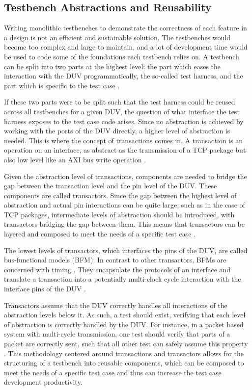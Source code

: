 \subsection{Testbench Abstractions and Reusability} %

Writing monolithic testbenches to demonstrate the correctness of each feature
in a design is not an efficient and sustainable solution. The testbenches would become too complex and large to
maintain, and a lot of development time would be
used to code some of the foundations each testbench relies on. A testbench can be split into two parts at the highest
level: the part which eases the interaction with the DUV programmatically, the so-called test harness, and the part
which is specific to the test case \cite[Ch. 6]{bergeron2012writing}.

If these two parts were to be split such that the test harness could be reused across all testbenches for a given
DUV, the question of what interface the test harness exposes to the test case code arises. Since no abstraction is
achieved by working with the ports of the DUV directly, a higher level of abstraction is needed. This is where the
concept of transactions comes in. A transaction is an operation on an interface, as abstract as the transmission of a
TCP package but also low level like an AXI bus write operation \cite[Ch. 1]{bergeron2005verification}.

Given the abstraction level of transactions, components are needed to bridge the gap between the transaction level
and the pin level of the DUV. These components are called transactors. Since the gap between the highest level of
abstraction and actual pin interactions can be quite large, such as in the case of TCP packages, intermediate levels
of abstraction should be introduced, with transactors bridging the gap between them. This means that transactors can
be layered and composed to meet the needs of a specific test case \cite[Ch. 4]{bergeron2012writing}.

The lowest levels of transactors, which interfaces the pins of the DUV, are called bus-functional models (BFM). In
contrast to other transactors, BFMs are concerned with timing \cite[Ch. 4]{bergeron2012writing}. They encapsulate the
protocols of an interface and translate a transaction into a potentially multi-clock cycle interaction with the
interface pins of the DUV \cite[Ch. 3]{salemi2013uvm}.

Transactors assume that the DUV correctly handles all interactions of the abstraction levels below it. As such, a
test should exist, verifying that each level of abstraction is correctly handled by the DUV. For instance, in a
packet based system with multi-cycle transmission, one test should verify that parts of a packet are correctly sent,
such that all other test can safely assume this property \cite[Ch. 6]{bergeron2012writing}. This methodology centered
around transactions and transactors allows for the structuring of a testbench into reusable components, which can be
composed to meet the needs of a specific test case and thus can increase the test case development productivity.

